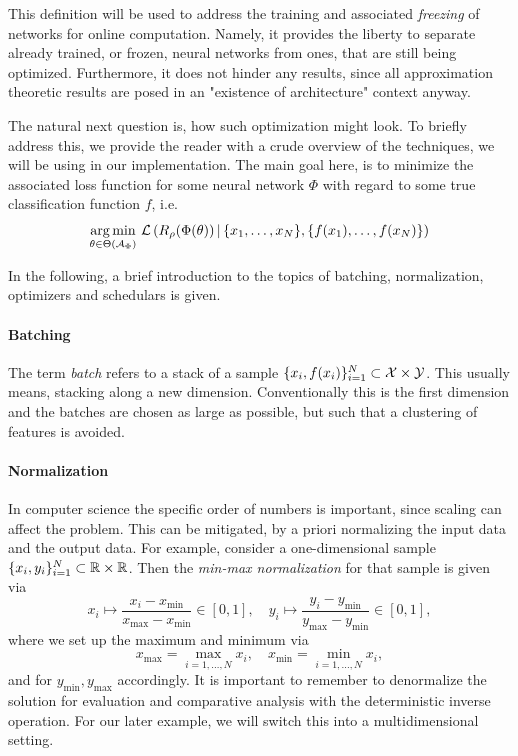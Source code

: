 This definition will be used to address the training and associated \emph{freezing} of networks for online computation.
Namely, it provides the liberty to separate already trained, or frozen, neural networks from ones, that are still
being optimized.
Furthermore, it does not hinder any results, since all approximation theoretic results are posed in an 
"existence of architecture" context anyway.

The natural next question is, how such optimization might look. To briefly address this, we
provide the reader with a crude overview of the techniques, we will be using in our implementation.
The main goal here, is to minimize the associated loss function for some neural network $\Phi$ 
with regard to some true classification function $f$, i.e.
\begin{equation*}
    \underset{\theta \in \Theta(\mathcal{A}_\Phi)}{\operatorname{arg \, min}} \,\, 
    \mathcal{L}\left(R_\rho(\Phi(\theta)) \, \vert \,  \{x_1, \dots, x_N\}, \{f(x_1), \dots, f(x_N)\}\right)
\end{equation*}

In the following, a brief introduction to the topics of batching, normalization, optimizers and
schedulars is given.

\paragraph{Batching}

The term \emph{batch} refers to a stack of a sample $\{x_i, f(x_i)\}_{i=1}^N \subset \mathcal{X} \times \mathcal{Y}$.
This usually means, stacking along a new dimension. Conventionally this is the first dimension and the
batches are chosen as large as possible, but such that a clustering of features is avoided.

\paragraph{Normalization}

In computer science the specific order of numbers is important, 
since scaling can affect the problem. This can be mitigated, by 
a priori normalizing the input data and the output data. For example, consider a one-dimensional sample 
$\{x_i, y_i\}_{i=1}^N \subset \mathbb{R} \times \mathbb{R}$.
Then the \emph{min-max normalization} for that sample is given via 
\begin{equation*}
    x_i \mapsto \frac{x_i - x_\text{min}}{x_\text{max} - x_\text{min}} \in [0, 1], \quad y_i \mapsto 
    \frac{y_i - y_\text{min}}{y_\text{max} - y_\text{min}} \in [0, 1],
\end{equation*}
where we set up the maximum and minimum via
\begin{equation*}
    x_\text{max} = \max\limits_{i = 1, \dots, N} x_i, \quad x_\text{min} = \min\limits_{i = 1, \dots, N} x_i,
\end{equation*}
and for $y_\text{min}, y_\text{max}$ accordingly. It is important to remember to 
denormalize the solution for evaluation and comparative analysis with the deterministic inverse
operation. For our later example, we will switch this into
a multidimensional setting.

